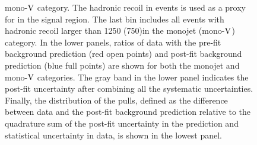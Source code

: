 \begin{figure}[hbtp]
\begin{center}
{mono-$\mathrm{V}$ category. The hadronic recoil \pt in \phojets events is used as a proxy for \ptmiss in the signal region.
The last bin includes all events with hadronic recoil \pt larger than 1250 (750)\GeV in the monojet (mono-$\mathrm{V}$) category.
In the lower panels, ratios of data with the pre-fit background
prediction (red open points) and post-fit background
prediction (blue full points) are shown for both the monojet and mono-$\mathrm{V}$ categories.
The gray band in the lower panel indicates the post-fit uncertainty
after combining all the systematic uncertainties. Finally, the distribution of the pulls, defined as the
difference between data and the post-fit background prediction relative to the quadrature sum of the
post-fit uncertainty in the prediction and statistical uncertainty in data, is shown in the lowest panel.
}
\label{fig:gamCR}\end{center}\end{figure}

